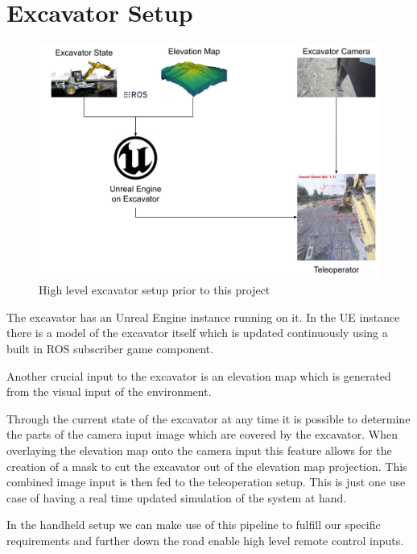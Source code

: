 \chapter{Excavator Setup}\label{ch:excavatorSetup}

\begin{figure}[ht]
    \centering
    \includegraphics[scale = 0.3]{images/excavator/excavator_setup.png}
    \caption{High level excavator setup prior to this project}
    \label{fig:ex_setup}
\end{figure}

The excavator has an Unreal Engine instance running on it. In the UE instance there is a model of the excavator itself which is updated continuously using a built in ROS subscriber game component.

Another crucial input to the excavator is an elevation map which is generated from the visual input of the environment.

Through the current state of the excavator at any time it is possible to determine the parts of the camera input image which are covered by the excavator. When overlaying the elevation map onto the camera input this feature allows for the creation of a mask to cut the excavator out of the elevation map projection. This combined image input is then fed to the teleoperation setup. This is just one use case of having a real time updated simulation of the system at hand. 

In the handheld setup we can make use of this pipeline to fulfill our specific requirements and further down the road enable high level remote control inputs.

